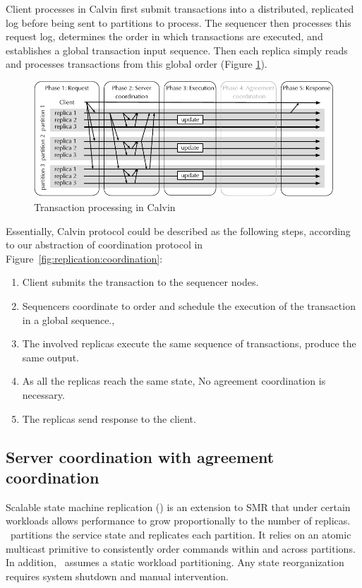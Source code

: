 Client processes in Calvin first submit transactions into a distributed,
replicated log before being sent to partitions to process. The sequencer then
processes this request log, determines the order in which transactions are
executed, and establishes a global transaction input sequence. Then each replica
simply reads and processes transactions from this global order (Figure
\ref{fig:calvin}).

\begin{figure}
  \begin{minipage}[b]{1.0\linewidth}
  \centering
        \includegraphics[width=1\linewidth]{figures/calvin}
  \end{minipage}
  \caption{Transaction processing in Calvin}
  \label{fig:calvin}
\end{figure}

Essentially, Calvin protocol could be described as the following steps, according to
our abstraction of coordination protocol in
Figure~\ref{fig:replication:coordination}:

\begin{enumerate}
  \item Client submits the transaction to the sequencer nodes.
  \item Sequencers coordinate to order and schedule the execution of the transaction in a global sequence.,
  \item The involved replicas execute the same sequence of transactions, produce the same output.
  \item As all the replicas reach the same state, No agreement coordination is necessary.
  \item The replicas send response to the client.
\end{enumerate}

\subsection{Server coordination with agreement coordination}
\label{sec:ssmr}
Scalable state machine replication (\ssmr) is an extension to SMR that under
certain workloads allows performance to grow proportionally to the number of
replicas. \ssmr\ partitions the service state and replicates each partition. It
relies on an atomic multicast primitive to consistently order commands within
and across partitions. In addition, \ssmr\ assumes a static workload
partitioning. Any state reorganization requires system shutdown and manual
intervention.

